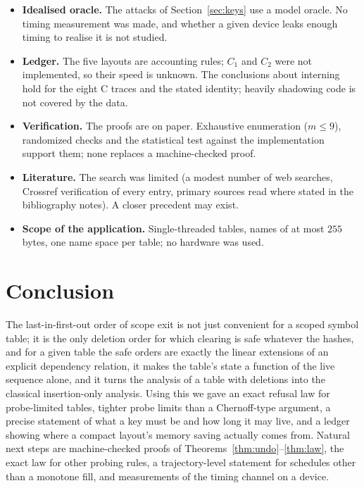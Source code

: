 \documentclass[11pt,a4paper]{article}
\theoremstyle{definition}
\theoremstyle{remark}
\begin{document}
\begin{itemize}[leftmargin=*]
\item \textbf{Idealised oracle.} The attacks of Section~\ref{sec:keys} use a model oracle. No timing measurement was made, and whether a given device leaks enough timing to realise it is not studied.
\item \textbf{Ledger.} The five layouts are accounting rules; $C_1$ and $C_2$ were not implemented, so their speed is unknown. The conclusions about interning hold for the eight C traces and the stated identity; heavily shadowing code is not covered by the data.
\item \textbf{Verification.} The proofs are on paper. Exhaustive enumeration ($m\le9$), randomized checks and the statistical test against the implementation support them; none replaces a machine-checked proof.
\item \textbf{Literature.} The search was limited (a modest number of web searches, Crossref verification of every entry, primary sources read where stated in the bibliography notes). A closer precedent may exist.
\item \textbf{Scope of the application.} Single-threaded tables, names of at most $255$ bytes, one name space per table; no hardware was used.
\end{itemize}

\section{Conclusion}\label{sec:conclusion}

The last-in-first-out order of scope exit is not just convenient for a scoped symbol table; it is the only deletion order for which clearing is safe whatever the hashes, and for a given table the safe orders are exactly the linear extensions of an explicit dependency relation, it makes the table's state a function of the live sequence alone, and it turns the analysis of a table with deletions into the classical insertion-only analysis. Using this we gave an exact refusal law for probe-limited tables, tighter probe limits than a Chernoff-type argument, a precise statement of what a key must be and how long it may live, and a ledger showing where a compact layout's memory saving actually comes from. Natural next steps are machine-checked proofs of Theorems~\ref{thm:undo}--\ref{thm:law}, the exact law for other probing rules, a trajectory-level statement for schedules other than a monotone fill, and measurements of the timing channel on a device.
\end{document}
